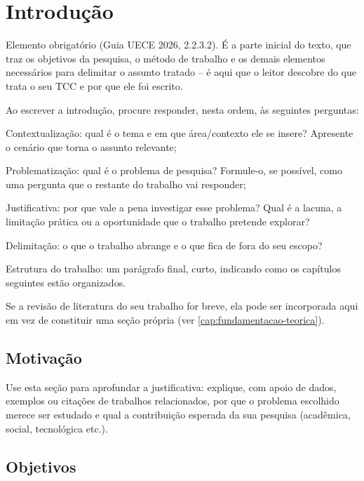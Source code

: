 \chapter{Introdução}
\label{cap:introducao}

Elemento obrigatório (Guia UECE 2026, 2.2.3.2). É a parte inicial do texto, que traz os objetivos da pesquisa, o método de trabalho e os demais elementos necessários para delimitar o assunto tratado -- é aqui que o leitor descobre do que trata o seu TCC e por que ele foi escrito.

Ao escrever a introdução, procure responder, nesta ordem, às seguintes perguntas:

\begin{alineas}
	\item Contextualização: qual é o tema e em que área/contexto ele se insere? Apresente o cenário que torna o assunto relevante;
	\item Problematização: qual é o problema de pesquisa? Formule-o, se possível, como uma pergunta que o restante do trabalho vai responder;
	\item Justificativa: por que vale a pena investigar esse problema? Qual é a lacuna, a limitação prática ou a oportunidade que o trabalho pretende explorar?
	\item Delimitação: o que o trabalho abrange e o que fica de fora do seu escopo?
	\item Estrutura do trabalho: um parágrafo final, curto, indicando como os capítulos seguintes estão organizados.
\end{alineas}

Se a revisão de literatura do seu trabalho for breve, ela pode ser incorporada aqui em vez de constituir uma seção própria (ver \autoref{cap:fundamentacao-teorica}).

\section{Motivação}
\label{sec:motivacao}

Use esta seção para aprofundar a justificativa: explique, com apoio de dados, exemplos ou citações de trabalhos relacionados, por que o problema escolhido merece ser estudado e qual a contribuição esperada da sua pesquisa (acadêmica, social, tecnológica etc.).

\section{Objetivos}
\label{sec:objetivos}


